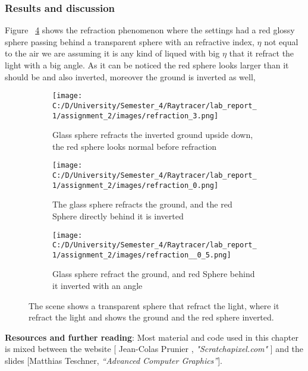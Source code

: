 \documentclass{article}
\begin{document}
	\subsubsection{Results and discussion}
	Figure ~\ref{fig:9} shows the refraction phenomenon where the settings had a red glossy sphere passing behind a transparent sphere with an refractive index, $\eta$ not equal to the air we are assuming it is any kind of liqued with big $\eta$ that it refract the light with a big angle. As it can be noticed the red sphere looks larger than it should be and also inverted, moreover the ground is inverted as well, 
	\begin{figure}[H]
		\begin{center}
			\begin{subfigure}{.3\textwidth}
				\centering
				\texttt{[image: C:/D/University/Semester\_4/Raytracer/lab\_report\_1/assignment\_2/images/refraction\_3.png]}  
				\caption{ Glass sphere refracts the inverted ground upside down, the red sphere looks normal before refraction}
				\label{fig:sub-first}
			\end{subfigure}
			\begin{subfigure}{.3\textwidth}
				\centering
				\texttt{[image: C:/D/University/Semester\_4/Raytracer/lab\_report\_1/assignment\_2/images/refraction\_0.png]}  
				\caption{The glass sphere refracts the ground, and the red Sphere directly behind it is inverted}
				\label{fig:sub-second}
			\end{subfigure}
			\begin{subfigure}{.3\textwidth}
				\centering
				\texttt{[image: C:/D/University/Semester\_4/Raytracer/lab\_report\_1/assignment\_2/images/refraction\_\_0\_5.png]}  
				\caption{ Glass sphere refract the ground, and red Sphere behind it inverted with an angle}
				\label{fig:sub-third}
			\end{subfigure}
			
			\caption{The scene shows a transparent sphere that refract the light, where it refract the light and shows the ground and the red sphere inverted.}
			\label{fig:9}
		\end{center}
	\end{figure}
	
	
	
	
	\textbf{Resources and further reading}: 
	Most material and code used in this chapter is mixed between the website [	Jean-Colas Prunier
	,	\textit{"Scratchapixel.com"}
	] and the slides 		[Matthias Teschner, 	\textit{“Advanced Computer Graphics”}].
	\clearpage
	
\end{document}

